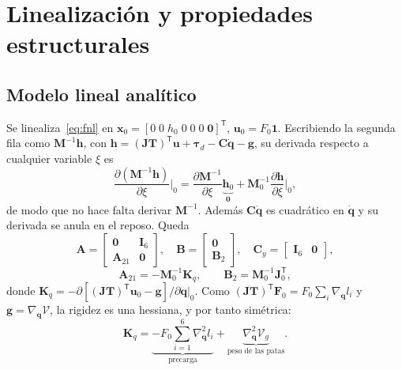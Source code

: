 \documentclass[conference]{IEEEtran}
\newcommand{\vect}[1]{\bm{#1}}
\newcommand{\T}{^{\mathsf{T}}}
\begin{document}
\section{Linealización y propiedades estructurales}\label{sec:lineal}

\subsection{Modelo lineal analítico}

Se linealiza~\eqref{eq:fnl} en $\vect x_0 = [0\;0\;h_0\;0\;0\;0\;\vect 0]\T$, $\vect u_0 = F_0\vect 1$. Escribiendo la segunda fila como $\vect M^{-1}\vect h$, con $\vect h = (\vect J\vect T)\T\vect u + \vect\tau_d - \vect C\dot{\vect q} - \vect g$, su derivada respecto a cualquier variable $\xi$ es
\begin{equation}
\frac{\partial(\vect M^{-1}\vect h)}{\partial\xi}\Big|_0 = \frac{\partial\vect M^{-1}}{\partial\xi}\underbrace{\vect h_0}_{\vect 0} + \vect M_0^{-1}\frac{\partial\vect h}{\partial\xi}\Big|_0 ,
\end{equation}
de modo que no hace falta derivar $\vect M^{-1}$. Además $\vect C\dot{\vect q}$ es cuadrático en $\dot{\vect q}$ y su derivada se anula en el reposo. Queda
\begin{equation}
\vect A = \begin{bmatrix}\vect 0 & \vect I_6\\ \vect A_{21} & \vect 0\end{bmatrix},\quad
\vect B = \begin{bmatrix}\vect 0\\ \vect B_2\end{bmatrix},\quad
\vect C_y = \begin{bmatrix}\vect I_6 & \vect 0\end{bmatrix},
\label{eq:AB}
\end{equation}
\begin{equation}
\vect A_{21} = -\vect M_0^{-1}\vect K_q,\qquad \vect B_2 = \vect M_0^{-1}\vect J_0\T,
\end{equation}
donde $\vect K_q = -\partial[(\vect J\vect T)\T\vect u_0 - \vect g]/\partial\vect q|_0$. Como $(\vect J\vect T)\T\vect F_0 = F_0\sum_i\nabla_{\vect q}l_i$ y $\vect g = \nabla_{\vect q}\mathcal V$, la rigidez es una hessiana, y por tanto simétrica:
\begin{equation}
\vect K_q = \underbrace{-F_0\sum_{i=1}^6\nabla^2_{\vect q}l_i}_{\text{precarga}} + \underbrace{\nabla^2_{\vect q}\mathcal V_g}_{\text{peso de las patas}} .
\label{eq:Kq}
\end{equation}
\end{document}
